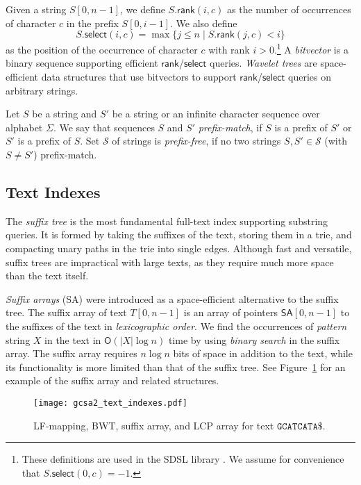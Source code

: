 \documentclass[twoside,leqno,twocolumn]{article}
\newcommand{\set}[1]{\ensuremath{\{ #1 \}}}
\newcommand{\abs}[1]{\ensuremath{\lvert #1 \rvert}}
\newcommand{\Oh}[1]{\ensuremath{\mathsf{O}\!\left( #1 \right)}}
\newcommand{\rank}{\ensuremath{\mathsf{rank}}}
\newcommand{\select}{\ensuremath{\mathsf{select}}}
\newcommand{\LFmapping}{LF\nobreakdash-mapping}
\newcommand{\SA}{\ensuremath{\mathsf{SA}}}
\begin{document}
Given a string $S[0, n-1]$, we define $S.\rank(i, c)$ as the number of occurrences of character $c$ in the prefix $S[0, i-1]$. We also define
$$
S.\select(i, c) = \max \set{ j \le n \mid S.\rank(j, c) < i }
$$
as the position of the occurrence of character $c$ with rank $i > 0$.\footnote{These definitions are used in the SDSL library \cite{Gog2014b}. We assume for convenience that $S.\select(0, c) = -1$.} A \emph{bitvector} is a binary sequence supporting efficient $\rank$/$\select$ queries. \emph{Wavelet trees} \cite{Grossi2003} are space-efficient data structures that use bitvectors to support $\rank$/$\select$ queries on arbitrary strings.

Let $S$ be a string and $S'$ be a string or an infinite character sequence over alphabet $\Sigma$. We say that sequences $S$ and $S'$ \emph{prefix-match}, if $S$ is a prefix of $S'$ or $S'$ is a prefix of $S$. Set $\mathcal{S}$ of strings is \emph{prefix-free}, if no two strings $S, S' \in \mathcal{S}$ (with $S \ne S'$) prefix-match.

\subsection{Text Indexes}

The \emph{suffix tree} \cite{Weiner1973} is the most fundamental full-text index supporting substring queries. It is formed by taking the suffixes of the text, storing them in a trie, and compacting unary paths in the trie into single edges. Although fast and versatile, suffix trees are impractical with large texts, as they require much more space than the text itself.

\emph{Suffix arrays} (SA) \cite{Manber1993} were introduced as a space-efficient alternative to the suffix tree. The suffix array of text $T[0, n-1]$ is an array of pointers $\SA[0, n-1]$ to the suffixes of the text in \emph{lexicographic order}. We find the occurrences of \emph{pattern} string $X$ in the text in $\Oh{\abs{X} \log n}$ time by using \emph{binary search} in the suffix array. The suffix array requires $n \log n$ bits of space in addition to the text, while its functionality is more limited than that of the suffix tree. See Figure~\ref{figure:indexes} for an example of the suffix array and related structures.

\begin{figure}
\texttt{[image: gcsa2\_text\_indexes.pdf]}
\caption{\protect\LFmapping, BWT, suffix array, and LCP array for text $\mathtt{GCATCATA}\$$.}\label{figure:indexes}
\end{figure}
\end{document}
